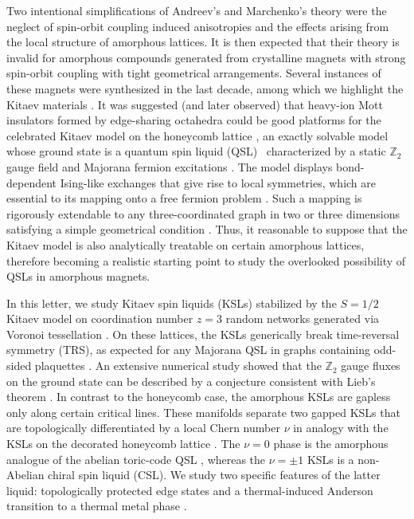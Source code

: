 \documentclass[%
 reprint,
superscriptaddress,
 amsmath,amssymb,
aps,
]{revtex4-2}
\begin{document}
\par
Two intentional simplifications of Andreev's and Marchenko's theory were the neglect of spin-orbit coupling induced anisotropies and the effects arising from the local structure of amorphous lattices. It is then expected that their theory is invalid for amorphous compounds generated from crystalline magnets with strong spin-orbit coupling with tight geometrical arrangements. Several instances of these magnets were synthesized in the last decade, among which we highlight the Kitaev materials \cite{Jackeli2009,HerrmannsAnRev2018,Winter2017,TrebstPhysRep2022,Takagi2019}. It was suggested (and later observed) that heavy-ion Mott insulators formed by edge-sharing octahedra could be good platforms for the celebrated Kitaev model on the honeycomb lattice \cite{Jackeli2009}, an exactly solvable model whose ground state is a quantum spin liquid (QSL)~\cite{Anderson1973,Knolle2019,Savary2016,Lacroix2011} characterized by a static $\mathbb Z_2$ gauge field and Majorana fermion excitations \cite{kitaevAnyonsExactlySolved2006}. The model displays bond-dependent Ising-like exchanges that give rise to local symmetries, which are essential to its mapping onto a free fermion problem \cite{Baskaran2007,Baskaran2008}. Such a mapping is rigorously extendable to any three-coordinated graph in two or three dimensions satisfying a simple geometrical condition \cite{Nussinov2009,OBrienPRB2016, yaoExactChiralSpin2007,Peri2020}. Thus, it reasonable to suppose that the Kitaev model is also analytically treatable on certain amorphous lattices, therefore becoming a realistic starting point to study the overlooked possibility of QSLs in amorphous magnets. \par
In this letter, we study Kitaev spin liquids (KSLs) stabilized by the $S=1/2$ Kitaev model \cite{kitaevAnyonsExactlySolved2006} on coordination number $z=3$ random networks generated via Voronoi tessellation \cite{mitchellAmorphousTopologicalInsulators2018,marsalTopologicalWeaireThorpeModels2020}. On these lattices, the KSLs generically break time-reversal symmetry (TRS), as expected for any Majorana QSL in graphs containing odd-sided plaquettes \cite{Chua2011,ChuaPRB2011,Fiete2012,Natori2016,Wu2009, WangHaoranPRB2021}. An extensive numerical study showed that the $\mathbb Z_2$ gauge fluxes on the ground state can be described by a conjecture consistent with Lieb's theorem \cite{lieb_flux_1994}. In contrast to the honeycomb case, the amorphous KSLs are gapless only along certain critical lines. These manifolds separate two gapped KSLs that are topologically differentiated by a local Chern number $\nu$ \cite{peru_preprint, mitchellAmorphousTopologicalInsulators2018} in analogy with the KSLs on the decorated honeycomb lattice \cite{yaoExactChiralSpin2007}. The $\nu=0$ phase is the amorphous analogue of the abelian toric-code QSL \cite{kitaev_fault-tolerant_2003}, whereas the $\nu=\pm1$ KSLs is a non-Abelian chiral spin liquid (CSL). We study two specific features of the latter liquid: topologically protected edge states and a thermal-induced Anderson transition to a thermal metal phase \cite{selfThermallyInducedMetallic2019}. \par
\end{document}

